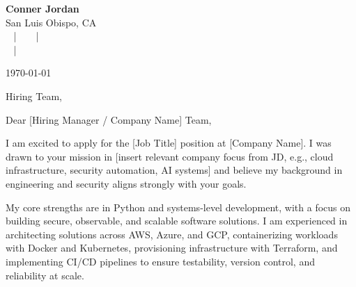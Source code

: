 \documentclass[letterpaper,11pt]{article}
\begin{document}
\begin{center}
  {\Huge \textbf{Conner Jordan}}\\[4pt]
  {\Large San Luis Obispo, CA}\\[4pt]
  \href{tel:+18059759793}{
    } ~ | ~
  \href{mailto:connercharlesjordan@gmail.com}{
    } ~ | ~
   \\
  \href{https://www.linkedin.com/in/conner-jordan-4b268514a/}{
    } ~ | ~
  \href{https://github.com/cjordan223}{
    }
\end{center}

\vspace{16pt}

\begin{flushright}
\ifdefined\jobdate\jobdate\else\today\fi
\end{flushright}

\noindent
Hiring Team,

\vspace{16pt}


Dear [Hiring Manager / Company Name] Team,

I am excited to apply for the [Job Title] position at [Company Name]. I was drawn to your mission in [insert relevant company focus from JD, e.g., cloud infrastructure, security automation, AI systems] and believe my background in engineering and security aligns strongly with your goals.

My core strengths are in Python and systems-level development, with a focus on building secure, observable, and scalable software solutions. I am experienced in architecting solutions across AWS, Azure, and GCP, containerizing workloads with Docker and Kubernetes, provisioning infrastructure with Terraform, and implementing CI/CD pipelines to ensure testability, version control, and reliability at scale.

\vspace{16pt}
\end{document}
